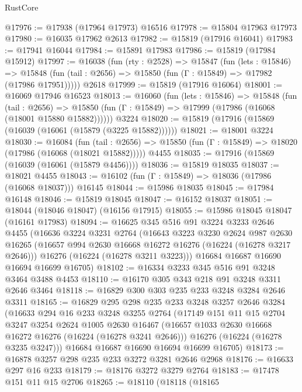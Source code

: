 \begin{lexlean}{RustCore}
\begin{coremodule}
@17976 := @17938 (@17964 @17973) @16516
@17978 := @15804 @17963 @17973
@17980 := @16035 @17962 @2613
@17982 := @15819 (@17916 @16041)
@17983 := @17941 @16044
@17984 := @15891 @17983
@17986 := @15819 (@17984 @15912)
@17997 := @16038
    (fun (rty : @2528) =>
    @15847
      (fun (lets : @15846) =>
      @15848 (fun (tail : @2656) => @15850 (fun (Γ : @15849) => @17982 (@17986 @17951)))))
    @2618
@17999 := @15819 (@17916 @16064)
@18001 := @16069 @17946 @16523
@18013 := @16060
    (fun (lets : @15846) =>
    @15848
      (fun (tail : @2656) =>
      @15850 (fun (Γ : @15849) => @17999 (@17986 (@16068 (@18001 @15880 @15882))))))
    @3224
@18020 := @15819 (@17916 (@15869 (@16039 (@16061 (@15879 (@3225 @15882))))))
@18021 := @18001 @3224
@18030 := @16084
    (fun (tail : @2656) => @15850 (fun (Γ : @15849) => @18020 (@17986 (@16068 (@18021 @15882)))))
    @4455
@18035 := @17916 (@15869 (@16039 (@16061 (@15879 @4456))))
@18036 := @15819 @18035
@18037 := @18021 @4455
@18043 := @16102 (fun (Γ : @15849) => @18036 (@17986 (@16068 @18037))) @16145
@18044 := @15986 @18035
@18045 := @17984 @16148
@18046 := @15819 @18045
@18047 := @16152 @18037
@18051 := @18044 (@18046 @18047) (@16156 @17915)
@18055 := @15986 @18045 @18047 (@16161 @17983)
@18094 := @16625
    @345
    @516
    @91
    @3224
    @3233
    @2646
    @4455
    (@16636
      @3224
      @3231
      @2764
      (@16643
        @3223
        @3230
        @2624
        @987
        @2630
        @16265
        (@16657 @994 @2630 @16668 @16272 @16276 (@16224 (@16278 @3217 @2646)))
        @16276
        (@16224 (@16278 @3211 @3223)))
      @16684
      @16687
      @16690
      @16694
      @16699
      @16705)
@18102 := @16334 @3233 @345 @516 @91 @3248 @3464 @3488 @4453
@18110 := @16170 @305 @343 @218 @91 @3248 @3311 @2646 @3464
@18118 := @16829 @300 @303 @235 @233 @3248 @3284 @2646 @3311
@18165 := @16829
    @295
    @298
    @235
    @233
    @3248
    @3257
    @2646
    @3284
    (@16633
      @294
      @16
      @233
      @3248
      @3255
      @2764
      (@17149
        @151
        @11
        @15
        @2704
        @3247
        @3254
        @2624
        @1005
        @2630
        @16467
        (@16657 @1033 @2630 @16668 @16272 @16276 (@16224 (@16278 @3241 @2646)))
        @16276
        (@16224 (@16278 @3235 @3247)))
      @16684
      @16687
      @16690
      @16694
      @16699
      @16705)
@18173 := @16878 @3257 @298 @235 @233 @3272 @3281 @2646 @2968
@18176 := @16633 @297 @16 @233
@18179 := @18176 @3272 @3279 @2764
@18183 := @17478 @151 @11 @15 @2706
@18265 := @18110
    (@18118
      (@18165

\end{coremodule}
\end{lexlean}
